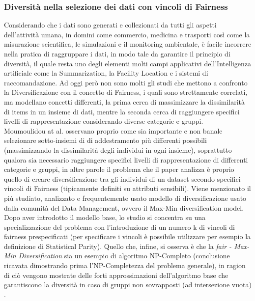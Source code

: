 \subsubsection{Diversità nella selezione dei dati con vincoli di Fairness}
Considerando che i dati sono generati e collezionati da tutti gli aspetti dell'attività umana, in domini come commercio, medicina e trasporti così come la misurazione scientifica, le simulazioni e il monitoring ambientale, è facile incorrere nella pratica di raggruppare i dati, in modo tale da garantire il principio di diversità, il quale resta uno degli elementi molti campi applicativi dell'Intelligenza artificiale come la Summarization, la Facility Location e i sistemi di raccomandazione. Ad oggi però non sono molti gli studi che mettono a confronto la Diversificazione con il concetto di Fairness, i quali sono strettamente correlati, ma modellano concetti differenti, la prima cerca di massimizzare la dissimilarità di items in un insieme di dati, mentre la seconda cerca di raggiungere specifici livelli di rappresentazione considerando diverse categorie e gruppi. \\ Moumoulidou at al. \cite{FairnessDefinitionExplained} osservano proprio come sia importante e non banale selezionare sotto-insiemi di di addestramento più differenti possibili (massimizzando la dissimilarità degli individui in ogni insieme), soprattutto qualora sia necessario raggiungere specifici livelli di rappresentazione di differenti categorie e gruppi, in altre parole il problema che il paper analizza è proprio quello di creare diversificazione tra gli individui di un dataset secondo specifici vincoli di Fairness (tipicamente definiti su attributi sensibili). Viene menzionato il più studiato, analizzato e frequentemente usato modello di diversificazione usato dalla comunità del Data Management, ovvero il Max-Min diversification model. Dopo aver introdotto il modello base, lo studio si concentra su una specializzazione del problema con l'introduzione di un numero k di vincoli di fairness prespecificati (per specificare i vincoli è possibile utilizzare per esempio la definizione di Statistical Parity). Quello che, infine, si osserva è che la \emph{fair - Max-Min Diversification} sia un esempio di algoritmo NP-Completo (conclusione ricavata dimostrando prima l'NP-Completezza del problema generale), in ragion di ciò vengono mostrate delle forti approssimazioni dell'algoritmo base che garantiscono la diversità in caso di gruppi non sovrapposti (ad intersezione vuota) \cite{moumoulidou2020diverse}.

